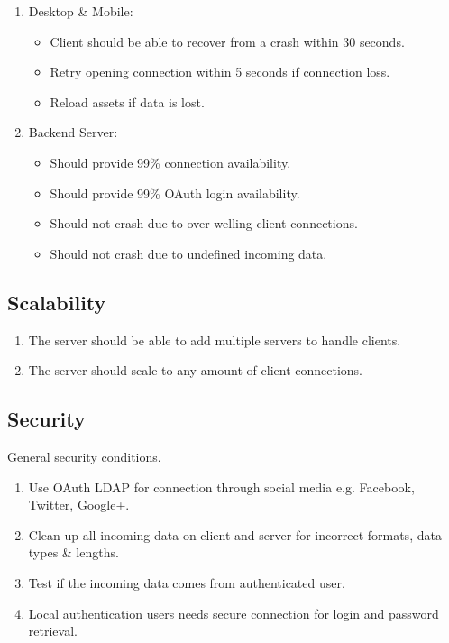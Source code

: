 \documentclass[letterpaper]{article}
\begin{document}
			\begin{enumerate}
				\item Desktop \& Mobile:
					\begin{itemize}
						\item Client should be able to recover from a crash within 30 seconds.
						\item Retry opening connection within 5 seconds if connection loss.
						\item Reload assets if data is lost.
					\end{itemize}
				\item Backend Server:
					\begin{itemize}
						\item Should provide 99\% connection availability.
						\item Should provide 99\% OAuth login availability.
						\item Should not crash due to over welling client connections.
						\item Should not crash due to undefined incoming data.
					\end{itemize}
			\end{enumerate}
			
			\subsection*{Scalability}
			\vspace{0.1in}
			
			\begin{enumerate}
				\item The server should be able to add multiple servers to handle clients.
				\item The server should scale to any amount of client connections.
			\end{enumerate}
			
			\subsection*{Security}
			\vspace{0.1in}
			
			General security conditions.
			\begin{enumerate}
				\item Use OAuth LDAP for connection through social media e.g. Facebook, Twitter, Google+.
				\item Clean up all incoming data on client and server for incorrect formats, data types \& lengths.
				\item Test if the incoming data comes from authenticated user.
				\item Local authentication users needs secure connection for login and password retrieval.
			\end{enumerate}
			
\end{document}
